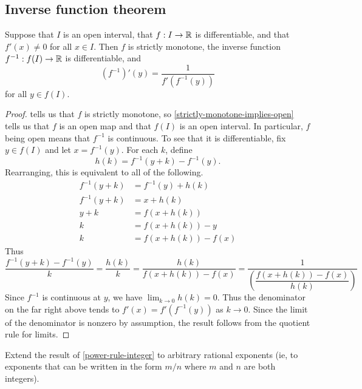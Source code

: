 \subsection{Inverse function theorem}

\begin{theorem} \label{inverse-function-theorem-single}
	Suppose that $I$ is an open interval, that $f : I \to \mathbb{R}$ is differentiable, and that $f'(x) \neq 0$ for all $x \in I$. Then $f$ is strictly monotone, the inverse function $f^{-1} : f(I) \to \mathbb{R}$ is differentiable, and 
	\[ (f^{-1})'(y) = \frac{1}{f'(f^{-1}(y))} \]
	for all $y \in f(I)$. 
\end{theorem}

\begin{proof}
	 tells us that $f$ is strictly monotone, so \cref{strictly-monotone-implies-open} tells us that $f$ is an open map and that $f(I)$ is an open interval. In particular, $f$ being open means that $f^{-1}$ is continuous. To see that it is differentiable, fix $y \in f(I)$ and let $x = f^{-1}(y)$. For each $k$, define \[ h(k) = f^{-1}(y + k) - f^{-1}(y). \]
	Rearranging, this is equivalent to all of the following. 
	\[ \begin{aligned} f^{-1}(y + k) &= f^{-1}(y) + h(k) \\
	f^{-1}(y + k) &= x + h(k) \\
	y + k &= f(x + h(k)) \\
	k &= f(x + h(k)) - y \\
	k &= f(x+h(k)) - f(x) \end{aligned} \]
	Thus
	\[ \frac{f^{-1}(y + k) - f^{-1}(y)}{k} = \frac{h(k)}{k} = \frac{h(k)}{f(x + h(k)) - f(x)} = \frac{1}{ \left( \dfrac{f(x + h(k)) - f(x)}{h(k)} \right) } \]
	Since $f^{-1}$ is continuous at $y$, we have $\lim_{k \to 0} h(k) = 0$. Thus the denominator on the far right above tends to $f'(x) = f'(f^{-1}(y))$ as $k \to 0$. Since the limit of the denominator is nonzero by assumption, the result follows from the quotient rule for limits. 
\end{proof}

\begin{exercise} \label{power-rule-fractional} 
	Extend the result of \cref{power-rule-integer} to arbitrary rational exponents (ie, to exponents that can be written in the form $m/n$ where $m$ and $n$ are both integers). 
\end{exercise}

